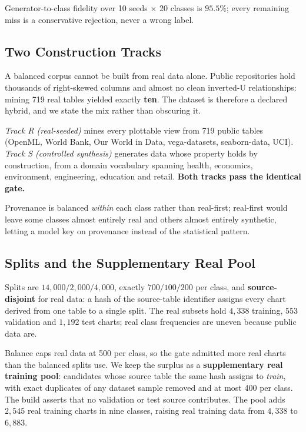 Generator-to-class fidelity over 10 seeds $\times$ 20 classes is $95.5\%$; every
remaining miss is a conservative rejection, never a wrong label.

\subsection{Two Construction Tracks}

A balanced corpus cannot be built from real data alone. Public repositories hold
thousands of right-skewed columns and almost no clean inverted-U relationships:
mining 719 real tables yielded exactly \textbf{ten}. The dataset is therefore a
declared hybrid, and we state the mix rather than obscuring it.

\emph{Track R (real-seeded)} mines every plottable view from 719 public tables
(OpenML, World Bank, Our World in Data, vega-datasets, seaborn-data, UCI).
\emph{Track S (controlled synthesis)} generates data whose property holds by
construction, from a domain vocabulary spanning health, economics, environment,
engineering, education and retail. \textbf{Both tracks pass the identical gate.}

Provenance is balanced \emph{within} each class rather than real-first;
real-first would leave some classes almost entirely real and others almost
entirely synthetic, letting a model key on provenance instead of the statistical
pattern.

\subsection{Splits and the Supplementary Real Pool}
\label{sec:splits}

Splits are $14{,}000/2{,}000/4{,}000$, exactly $700/100/200$ per class, and
\textbf{source-disjoint} for real data: a hash of the source-table identifier
assigns every chart derived from one table to a single split. The real subsets hold
$4{,}338$ training, $553$ validation and $1{,}192$ test charts; real class frequencies
are uneven because public data are.

Balance caps real data at 500 per class, so the gate admitted more real charts than
the balanced splits use. We keep the surplus as a \textbf{supplementary real training
pool}: candidates whose source table the same hash assigns to \emph{train}, with exact
duplicates of any dataset sample removed and at most 400 per class. The build asserts
that no validation or test source contributes. The pool adds $2{,}545$ real training
charts in nine classes, raising real training data from $4{,}338$ to $6{,}883$.

